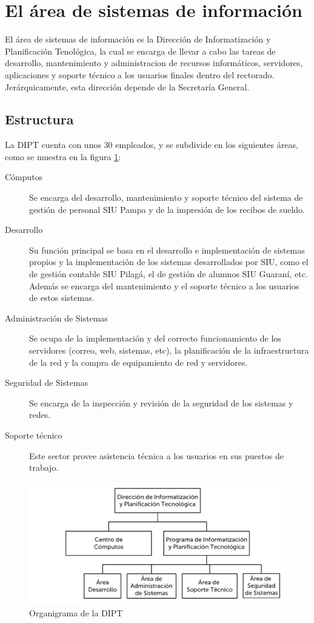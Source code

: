 \documentclass[a4paper,11pt,oneside]{article}
\begin{document}
%
\section{El área de sistemas de información}
%
El área de sistemas de información es la Dirección de Informatización
y Planificación Tenológica, la cual se encarga de llevar a cabo las
tareas de desarrollo, mantenimiento y administracion de recursos
informáticos, servidores, aplicaciones y soporte técnico a los
usuarios finales dentro del rectorado.
Jerárquicamente, esta dirección depende de la Secretaría General.
%
\subsection{Estructura}
%
La DIPT cuenta con unos 30 empleados, y se subdivide en los siguientes
áreas, como se muestra en la figura \ref{organi-dipt}:
\begin{description}
\item[Cómputos]
  Se encarga del desarrollo, mantenimiento y soporte técnico del
  sistema de gestión de personal SIU Pampa y de la impresión de los
  recibos de sueldo.
%
\item[Desarrollo]
  Su función principal se basa en el desarrollo e implementación de
  sistemas propios y la implementación de los sistemas desarrollados
  por SIU, como el de gestión contable SIU Pilagá, el de gestión de
  alumnos SIU Guaraní, etc. Además se encarga del mantenimiento y el
  soporte técnico a los usuarios de estos sistemas.
%
\item[Administración de Sistemas]
  Se ocupa de la implementación y del correcto funcionamiento de los
  servidores (correo, web, sistemas, etc), la planificación de la
  infraestructura de la red y la compra de equipamiento de red y
  servidores.
%
\item[Seguridad de Sistemas]
  Se encarga de la inspección y revisión de la seguridad de los
  sistemas y redes.
%
\item[Soporte técnico]
  Este sector provee asistencia técnica a los usuarios en sus puestos
  de trabajo.
\end{description}
%
\begin{figure}[H]
  \center\includegraphics[width=127mm]{img/organi_dipt}
  \caption{Organigrama de la DIPT}
  \label{organi-dipt}
\end{figure}
%
\end{document}
